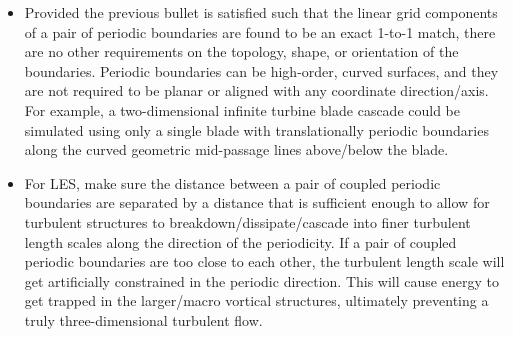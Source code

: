 \begin{itemize}
    For a pair of matching linear cell faces on periodic boundaries, the
    geometries for both faces of the pair need to match (\thatis both
    triangles, or both quadrilaterals), and the set of grid vertices for both
    faces need to create a matching set.
    For example, let us say we have face $a$ defined by vertices $[1,2,3]$, and
    it was found to be a periodic match for face $b$ defined by vertices
    $[143,22,200]$.
    For this to be a valid match, vertex 1 needs to match to one of the three
    vertices for face $b$; for this example we will say it matches to vertex
    200.
    Vertex 2 then needs to be a match to either vertex 143 or 22; we will say 22
    for this example.
    That means vertex 3 \emph{must} be a match to vertex 143, or else this is
    not a valid pair of matching faces.
    Finally, the order of the matched vertices is not important here since after
    the faces are confirmed to be a valid match, the ordering will be used to
    find the relative rotation between the two faces.
  \item
    Provided the previous bullet is satisfied such that the linear grid
    components of a pair of periodic boundaries are found to be an exact
    1-to-1 match, there are no other requirements on the topology, shape,
    or orientation of the boundaries.
    Periodic boundaries can be high-order, curved surfaces, and they are not
    required to be planar or aligned with any coordinate direction\slash axis.
    For example, a two-dimensional infinite turbine blade cascade could be
    simulated using only a single blade with translationally periodic boundaries
    along the curved geometric mid-passage lines above\slash below the blade.
  \item
    For LES, make sure the distance between a pair of coupled
    periodic boundaries are separated by a distance that is sufficient enough to
    allow for turbulent structures to breakdown\slash dissipate\slash cascade
    into finer turbulent length scales along the direction of the periodicity.
    If a pair of coupled periodic boundaries are too close to each other, the
    turbulent length scale will get artificially constrained in the periodic
    direction.
    This will cause energy to get trapped in the larger\slash macro vortical
    structures, ultimately preventing a truly three-dimensional turbulent flow.
    

\end{itemize}
